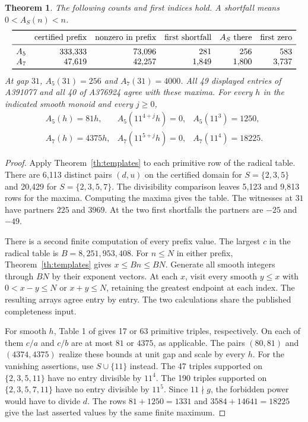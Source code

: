 \documentclass[11pt,letterpaper]{article}
\newtheorem{theorem}{Theorem}
\begin{document}
\begin{theorem}\label{th:numeric}
The following counts and first indices hold. A shortfall means $0<A_S(n)<n$.
\[
\begin{array}{lrrrrr}
\toprule
 &\text{certified prefix}&\text{nonzero in prefix}&\text{first shortfall}&A_S\text{ there}&\text{first zero}\\
\midrule
A_5 &333{,}333&73{,}096&281&256&583\\
A_7 &47{,}619&42{,}257&1{,}849&1{,}800&3{,}737\\
\bottomrule
\end{array}
\]
At gap $31$, $A_5(31)=256$ and $A_7(31)=4000$. All 49 displayed entries of A391077 and all 40 of A376924 agree with these maxima. For every $h$ in the indicated smooth monoid and every $j\ge0$,
\[
\begin{array}{lll}
 A_5(h)=81h,   & A_5(11^{4+j}h)=0, & A_5(11^3)=1250,\\
 A_7(h)=4375h, & A_7(11^{5+j}h)=0, & A_7(11^4)=18225 .
\end{array}
\]
\end{theorem}
\begin{proof}
Apply Theorem~\ref{th:templates} to each primitive row of the radical table. There are 6,113 distinct pairs $(d,u)$ on the certified domain for $S=\{2,3,5\}$ and 20,429 for $S=\{2,3,5,7\}$. The divisibility comparison leaves 5,123 and 9,813 rows for the maxima. Computing the maxima gives the table. The witnesses at $31$ have partners $225$ and $3969$. At the two first shortfalls the partners are $-25$ and $-49$.

There is a second finite computation of every prefix value. The largest $c$ in the radical table is $B=8{,}251{,}953{,}408$. For $n\le N$ in either prefix, Theorem~\ref{th:templates} gives $x\le Bn\le BN$. Generate all smooth integers through $BN$ by their exponent vectors. At each $x$, visit every smooth $y\le x$ with $0<x-y\le N$ or $x+y\le N$, retaining the greatest endpoint at each index. The resulting arrays agree entry by entry. The two calculations share the published completeness input.

For smooth $h$, Table 1 of \cite{data} gives 17 or 63 primitive triples, respectively. On each of them $c/a$ and $c/b$ are at most $81$ or $4375$, as applicable. The pairs $(80,81)$ and $(4374,4375)$ realize these bounds at unit gap and scale by every $h$. For the vanishing assertions, use $S\cup\{11\}$ instead. The 47 triples supported on $\{2,3,5,11\}$ have no entry divisible by $11^4$. The 190 triples supported on $\{2,3,5,7,11\}$ have no entry divisible by $11^5$. Since $11\nmid g$, the forbidden power would have to divide $d$. The rows $81+1250=1331$ and $3584+14641=18225$ give the last asserted values by the same finite maximum.
\end{proof}
\end{document}
